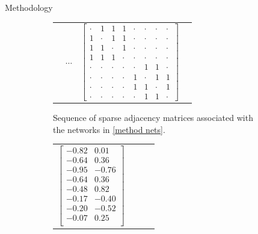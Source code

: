 \documentclass[12pt]{amsart}
\begin{document}
\begin{section}{Methodology}
\begin{figure}
\begin{subfigure}[c]{1\textwidth}
\begin{tabular}{llll}
                    &
                    $\cdots$
                    &
                    $\begin{bmatrix}
                        \cdot & 1 & 1 & 1 & \cdot & \cdot & \cdot & \cdot\\
                        1 & \cdot & 1 & 1 & \cdot & \cdot & \cdot & \cdot\\
                        1 & 1 & \cdot & 1 & \cdot & \cdot & \cdot & \cdot\\
                        1 & 1 & 1 & \cdot & \cdot & \cdot & \cdot & \cdot\\
                        \cdot & \cdot & \cdot & \cdot & \cdot & 1 & 1 & \cdot\\
                        \cdot & \cdot & \cdot & \cdot & 1 & \cdot & 1 & 1\\
                        \cdot & \cdot & \cdot & \cdot & 1 & 1 & \cdot & 1\\
                        \cdot & \cdot & \cdot & \cdot & \cdot & 1 & 1 & \cdot
                    \end{bmatrix}$
                    
                \end{tabular}
                \caption{Sequence of sparse adjacency matrices associated with the networks in \autoref{method nets}.}
                \label{method adjacency}
            \end{subfigure}
    
            \begin{subfigure}[c]{1\textwidth}
                \begin{tabular}{llll}
                    $\begin{bmatrix}
                        -0.82  & 0.01\\
                        -0.64  & 0.36\\
                        -0.95 & -0.76\\
                        -0.64 &  0.36\\
                        -0.48 &  0.82\\
                        -0.17 & -0.40\\
                        -0.20 & -0.52\\
                        -0.07 &  0.25\\
                    \end{bmatrix}$
                
                &
                

\end{tabular}
\end{subfigure}
\end{figure}
\end{section}
\end{document}
